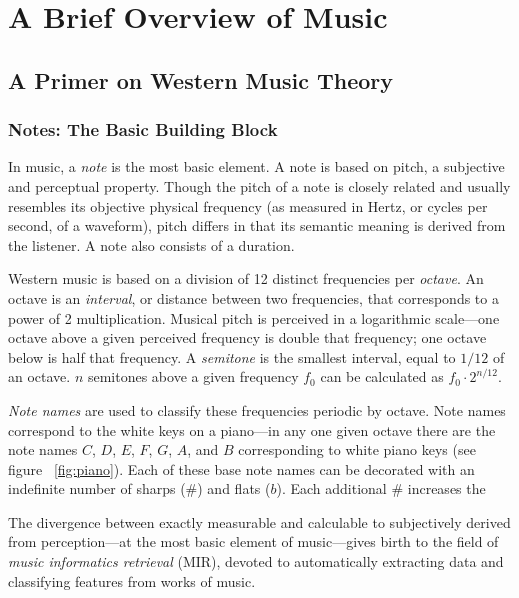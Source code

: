 \chapter{A Brief Overview of Music}

\section{A Primer on Western Music Theory}

\subsection{Notes: The Basic Building Block}

In music, a \textit{note} is the most basic element. A note is based on pitch, a subjective and perceptual property. Though the pitch of a note is closely related and usually resembles its objective physical frequency (as measured in Hertz, or cycles per second, of a waveform), pitch differs in that its semantic meaning is derived from the listener. A note also consists of a duration.

Western music is based on a division of 12 distinct frequencies per \textit{octave}. An octave is an \textit{interval}, or distance between two frequencies, that corresponds to a power of 2 multiplication. Musical pitch is perceived in a logarithmic scale---one octave above a given perceived frequency is double that frequency; one octave below is half that frequency. A \textit{semitone} is the smallest interval, equal to $1/12$ of an octave. $n$ semitones above a given frequency $f_0$ can be calculated as $f_0 \cdot 2^{n/12}$.

\textit{Note names} are used to classify these frequencies periodic by octave. Note names correspond to the white keys on a piano---in any one given octave there are the note names $C$, $D$, $E$, $F$, $G$, $A$, and $B$ corresponding to white piano keys (see figure ~\ref{fig:piano}). Each of these base note names can be decorated with an indefinite number of sharps ($\#$) and flats ($b$). Each additional $\#$ increases the 

The divergence between exactly measurable and calculable to subjectively derived from perception---at the most basic element of music---gives birth to the field of \textit{music informatics retrieval} (MIR), devoted to automatically extracting data and classifying features from works of music.